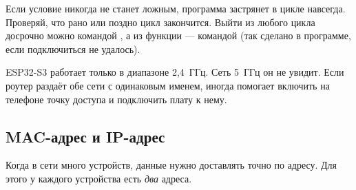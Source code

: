 \begin{caution}
Если условие  никогда не станет ложным, программа застрянет в цикле навсегда. Проверяй, что
рано или поздно цикл закончится. Выйти из любого цикла досрочно можно командой , а из
функции --- командой  (так сделано в программе, если подключиться не удалось).
\end{caution}

\begin{caution}
ESP32-S3 работает только в диапазоне 2,4~ГГц. Сеть 5~ГГц он не увидит. Если роутер раздаёт обе сети с
одинаковым именем, иногда помогает включить на телефоне точку доступа и подключить плату к нему.
\end{caution}


\subsection{MAC-адрес и IP-адрес}

Когда в сети много устройств, данные нужно доставлять точно по адресу. Для этого у каждого
устройства есть \emph{два} адреса.

